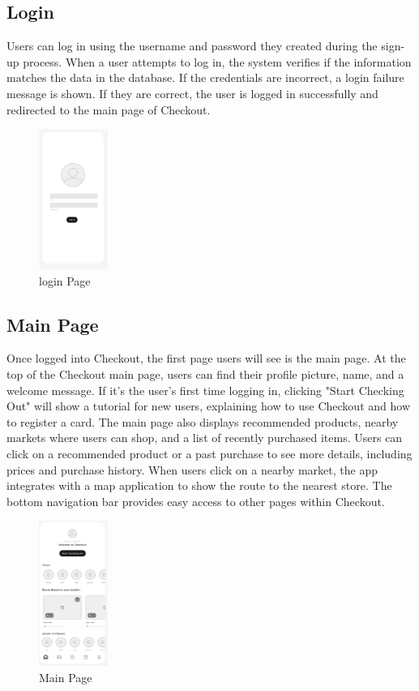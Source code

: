 \documentclass[conference]{IEEEtran}
\begin{document}
\subsection{Login}
Users can log in using the username and password they created during the sign-up process. When a user attempts to log in, the system verifies if the information matches the data in the database. If the credentials are incorrect, a login failure message is shown. If they are correct, the user is logged in successfully and redirected to the main page of Checkout.
\begin{figure}[H]  %
    \centering  %
    \includegraphics[width=0.2\textwidth]{login.PNG}  %
    \caption{login Page}  %
\end{figure}
\subsection{Main Page}
Once logged into Checkout, the first page users will see is the main page. At the top of the Checkout main page, users can find their profile picture, name, and a welcome message. If it's the user's first time logging in, clicking "Start Checking Out" will show a tutorial for new users, explaining how to use Checkout and how to register a card.
The main page also displays recommended products, nearby markets where users can shop, and a list of recently purchased items. Users can click on a recommended product or a past purchase to see more details, including prices and purchase history.
When users click on a nearby market, the app integrates with a map application to show the route to the nearest store. The bottom navigation bar provides easy access to other pages within Checkout.
\begin{figure}[H]  %
    \centering  %
    \includegraphics[width=0.2\textwidth]{main.PNG}  %
    \caption{Main Page}  %
\end{figure}
\end{document}
